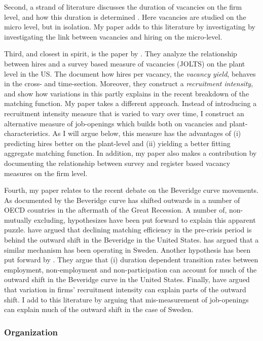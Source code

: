 Second, a strand of literature discusses the duration of vacancies on the firm level, and how this duration is determined \citep{Ours1991, Burdett1998, Barron1997, Holzer1990}. Here vacancies are studied on the micro level, but in isolation. My paper adds to this literature by investigating by investigating the link between vacancies and hiring on the micro-level. 

Third, and closest in spirit, is the paper by \cite{Davis2013}. They analyze the relationship between hires and a survey based measure of vacancies (JOLTS) on the plant level in the US. The document how hires per vacancy, the \emph{vacancy yield}, behaves in the cross- and time-section. Moreover, they construct a \emph{recruitment intensity}, and show how variations in this partly explains in the recent breakdown of the matching function. My paper takes a different approach. Instead of introducing a recruitment intensity measure that is varied to vary over time, I construct an alternative measure of job-openings which builds both on vacancies and plant-characteristics. As I will argue below, this measure has the advantages of (i) predicting hires better on the plant-level and (ii) yielding a better fitting aggregate matching function. In addition, my paper also makes a contribution by documenting the relationship between survey and register based vacancy measures on the firm level. 

Fourth, my paper relates to the recent debate on the Beveridge curve movements. As documented by \cite{Hobijn2012} the Beveridge curve has shifted outwards in a number of OECD countries in the aftermath of the Great Recession. A number of, non-mutually excluding, hypothesizes have been put forward to explain this apparent puzzle. \cite{Hall2015} have argued that declining matching efficiency in the pre-crisis period is behind the outward shift in the Beveridge in the United States. \cite{Riksbank2012} has argued that a similar mechanism has been operating in Sweden. Another hypothesis has been put forward by \cite{Kroft2016}. They argue that (i) duration dependent transition rates between employment, non-employment and non-participation can account for much of the outward shift in the Beveridge curve in the United States. Finally, \cite{Davis2013} have argued that variation in firms’ recruitment intensity can explain parts of the outward shift. I add to this literature by arguing that mis-measurement of job-openings can explain much of the outward shift in the case of Sweden. 

\subsubsection{Organization}

